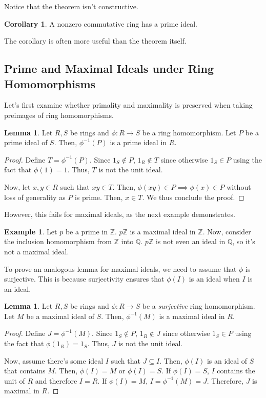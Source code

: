 \documentclass{article}
\theoremstyle{definition}
\newtheorem{lemma}[theorem]{Lemma}
\newtheorem{corollary}{Corollary}[theorem]
\newtheorem{example}[theorem]{Example}
\newcommand{\Z}{\mathbb{Z}}
\newcommand{\Q}{\mathbb{Q}}
\begin{document}
Notice that the theorem isn't constructive.

\begin{corollary}
    A nonzero commutative ring has a prime ideal.
\end{corollary}

The corollary is often more useful than the theorem itself.

\newpage

\subsection{Prime and Maximal Ideals under Ring Homomorphisms}

Let's first examine whether primality and maximality is preserved
when taking preimages of ring homomorphisms.

\begin{lemma}
    Let $R,S$ be rings and $\phi: R \xrightarrow{} S$ be a ring homomorphism.
    Let $P$ be a prime ideal of $S$. Then, $\phi^{-1}(P)$ is a prime ideal in $R$.
\end{lemma}
\begin{proof}
    Define $T = \phi^{-1}(P)$. Since $1_{S} \notin P$, $1_{R} \notin T$ since otherwise
    $1_{S} \in P$ using the fact that $\phi(1) = 1$. Thus, $T$ is not the unit ideal.

    Now, let $x,y \in R$ such that $xy \in T$. Then, $\phi(xy) \in P \implies \phi(x) \in P$
    without loss of generality as $P$ is prime. Then, $x \in T$. We thus conclude the proof.
\end{proof}

However, this fails for maximal ideals, as the next example demonstrates.

\begin{example}
    Let $p$ be a prime in $\Z$. $p\Z$ is a maximal ideal in $\Z$. Now,
    consider the inclusion homomorphism from $\Z$ into $\Q$. $p\Z$ is
    not even an ideal in $\Q$, so it's not a maximal ideal.
\end{example}

To prove an analogous lemma for maximal ideals, we need to assume that $\phi$ is surjective.
This is because surjectivity ensures that $\phi(I)$ is an ideal when $I$ is an ideal.

\begin{lemma}
    Let $R,S$ be rings and $\phi: R \xrightarrow{} S$ be a \textit{surjective} ring homomorphism.
    Let $M$ be a maximal ideal of $S$. Then, $\phi^{-1}(M)$ is a maximal ideal in $R$.
\end{lemma}
\begin{proof}
    Define $J = \phi^{-1}(M)$. Since $1_{S} \notin P$, $1_{R} \notin J$ since otherwise
    $1_{S} \in P$ using the fact that $\phi(1_{R}) = 1_{S}$. Thus, $J$ is not the unit ideal.

    Now, assume there's some ideal $I$ such that $J \subseteq I$. Then, $\phi(I)$ is an ideal
    of $S$ that contains $M$. Then, $\phi(I) = M$ or $\phi(I) = S$. If $\phi(I) = S$, $I$ 
    contains the unit of $R$ and therefore $I = R$. If $\phi(I) = M$, $I = \phi^{-1}(M) = J$.
    Therefore, $J$ is maximal in $R$.
\end{proof}
\end{document}
